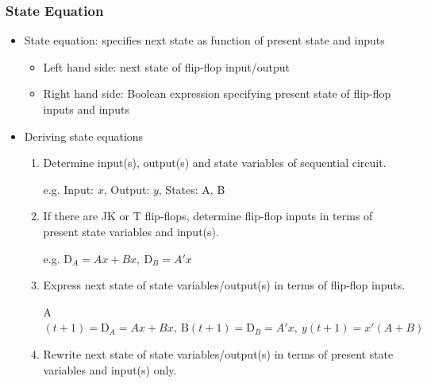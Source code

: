 \documentclass[a4paper]{article}
\begin{document}
\subsubsection{State Equation}
\begin{itemize}
    \item State equation: specifies next state as function of present state and inputs
    \begin{itemize}[label=$\circ$]
        \item Left hand side: next state of flip-flop input/output
        \item Right hand side: Boolean expression specifying present state of flip-flop inputs and inputs
    \end{itemize}
    \item Deriving state equations
    \begin{enumerate}
        \item Determine input(s), output(s) and state variables of sequential circuit.
        \begin{center}
            e.g. Input: $x$, Output: $y$, States: A, B
        \end{center}
        \item If there are JK or T flip-flops, determine flip-flop inputs in terms of present state variables and input(s).
        \begin{center}
            e.g. $\text{D}_A = Ax+Bx,\ \text{D}_B = A'x$
        \end{center}
        \item Express next state of state variables/output(s) in terms of flip-flop inputs.
        \begin{center}
            A$(t+1) = \text{D}_A = Ax+Bx,\ \text{B}(t+1) = \text{D}_B = A'x,\ y(t+1) = x'(A+B)$
        \end{center}
        \item Rewrite next state of state variables/output(s) in terms of present state variables and input(s) only.
    \end{enumerate}
\end{itemize}

\newpage
\end{document}
